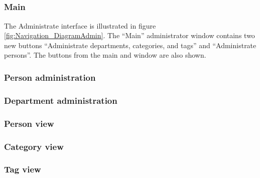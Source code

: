 \subsection{\ainterface}
\label{sec:admininterface}

\subsubsection{Main}
The Administrate interface is illustrated in figure \ref{fig:Navigation_DiagramAdmin}.
The ``Main'' administrator window contains two new buttons ``Administrate departments, categories, and tags'' and ``Administrate persons''. The buttons from the main \astaff and \aclient window are also shown.  

\subsubsection{Person administration}

\subsubsection{Department administration}

\subsubsection{Person view}

\subsubsection{Category view}

\subsubsection{Tag view}

